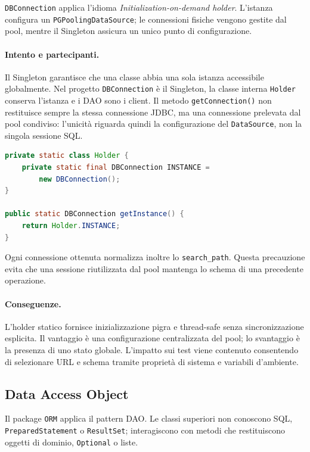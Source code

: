 \documentclass[12pt,a4paper]{article}
\newcommand{\code}[1]{\nolinkurl{#1}}
\begin{document}
\code{DBConnection} applica l'idioma \emph{Initialization-on-demand holder}.
L'istanza configura un \code{PGPoolingDataSource}; le connessioni fisiche vengono
gestite dal pool, mentre il Singleton assicura un unico punto di configurazione.

\paragraph{Intento e partecipanti.}
Il Singleton garantisce che una classe abbia una sola istanza accessibile
globalmente. Nel progetto \code{DBConnection} è il Singleton, la classe interna
\code{Holder} conserva l'istanza e i DAO sono i client. Il metodo
\code{getConnection()} non restituisce sempre la stessa connessione JDBC, ma
una connessione prelevata dal pool condiviso: l'unicità riguarda quindi la
configurazione del \code{DataSource}, non la singola sessione SQL.

\begin{lstlisting}[style=codeStyle,language=Java,
caption={Singleton thread-safe con holder statico.}]
private static class Holder {
    private static final DBConnection INSTANCE =
        new DBConnection();
}

public static DBConnection getInstance() {
    return Holder.INSTANCE;
}
\end{lstlisting}

Ogni connessione ottenuta normalizza inoltre lo \code{search\_path}. Questa
precauzione evita che una sessione riutilizzata dal pool mantenga lo schema di
una precedente operazione.

\paragraph{Conseguenze.}
L'holder statico fornisce inizializzazione pigra e thread-safe senza
sincronizzazione esplicita. Il vantaggio è una configurazione centralizzata del
pool; lo svantaggio è la presenza di uno stato globale. L'impatto sui test viene
contenuto consentendo di selezionare URL e schema tramite proprietà di sistema
e variabili d'ambiente.

\subsection{Data Access Object}

Il package \code{ORM} applica il pattern DAO. Le classi superiori non conoscono
SQL, \code{PreparedStatement} o \code{ResultSet}; interagiscono con metodi che
restituiscono oggetti di dominio, \code{Optional} o liste.
\end{document}
